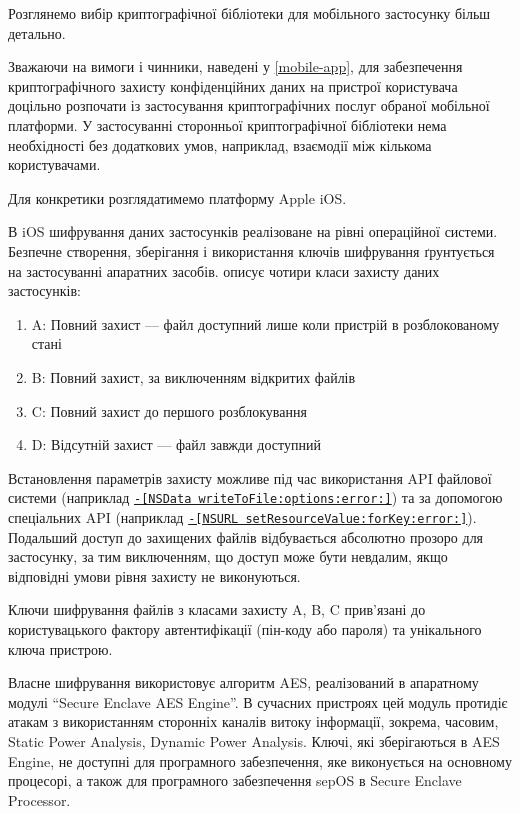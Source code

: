 \documentclass{kpi-lab}
\begin{document}
Розглянемо вибір криптографічної бібліотеки для мобільного застосунку
більш детально.

Зважаючи на вимоги і чинники, наведені у \ref{mobile-app},
для забезпечення криптографічного захисту конфіденційних даних
на пристрої користувача доцільно розпочати із застосування
криптографічних послуг обраної мобільної платформи.
У застосуванні сторонньої криптографічної бібліотеки нема
необхідності без додаткових умов,
наприклад, взаємодії між кількома користувачами.

Для конкретики розглядатимемо платформу Apple iOS.

В iOS шифрування даних застосунків реалізоване на рівні
операційної системи.
Безпечне створення, зберігання і використання ключів шифрування
ґрунтується на застосуванні апаратних засобів.
\cite[Apple Platform Security][]{apple-platform-security}
описує чотири класи захисту даних застосунків:
\begin{enumerate}
  \item A: Повний захист --- файл доступний лише коли
    пристрій в розблокованому стані
  \item B: Повний захист, за виключенням відкритих файлів
  \item C: Повний захист до першого розблокування
  \item D: Відсутній захист --- файл завжди доступний
\end{enumerate}
Встановлення параметрів захисту можливе під час використання
API файлової системи
(наприклад
  \href{https://developer.apple.com/documentation/foundation/nsdata/write(tofile:options:)}
{\texttt{-[NSData writeToFile:options:error:]}})
та за допомогою спеціальних API
(наприклад
  \href{https://developer.apple.com/documentation/foundation/nsurl/setresourcevalue(_:forkey:)}
{\texttt{-[NSURL setResourceValue:forKey:error:]}}).
Подальший доступ до захищених файлів відбувається абсолютно
прозоро для застосунку,
за тим виключенням, що доступ може бути невдалим, якщо
відповідні умови рівня захисту не виконуються.

Ключи шифрування файлів з класами захисту A, B, C
прив'язані до користувацького фактору автентифікації
(пін-коду або пароля) та унікального ключа пристрою.

Власне шифрування використовує алгоритм AES, реалізований в
апаратному модулі \enquote{Secure Enclave AES Engine}.
В сучасних пристроях цей модуль протидіє атакам
з використанням сторонніх каналів витоку інформації, зокрема,
часовим, Static Power Analysis, Dynamic Power Analysis.
Ключі, які зберігаються в AES Engine, не доступні для
програмного забезпечення, яке виконується на основному процесорі,
а також для програмного забезпечення sepOS в Secure
Enclave Processor.
\end{document}
